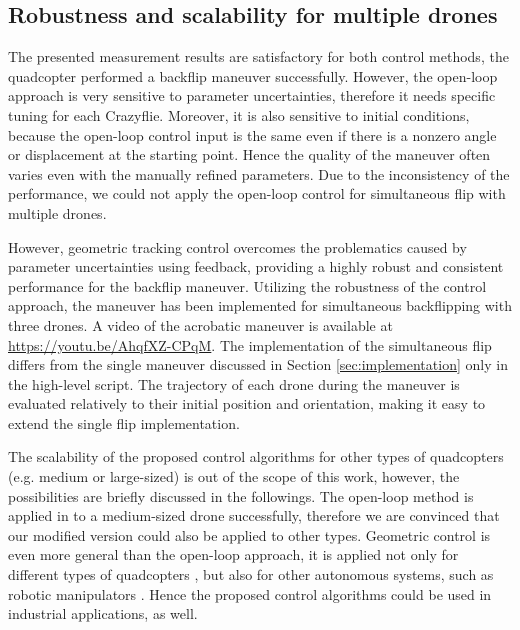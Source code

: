 \subsection{Robustness and scalability for multiple drones}
The presented measurement results are satisfactory for both control methods, the quadcopter performed a backflip maneuver successfully. However, the open-loop approach is very sensitive to parameter uncertainties, therefore it needs specific tuning for each Crazyflie. Moreover, it is also sensitive to initial conditions, because the open-loop control input is the same even if there is a nonzero angle or displacement at the starting point. Hence the quality of the maneuver often varies even with the manually refined parameters. Due to the inconsistency of the performance, we could not apply the open-loop control for simultaneous flip with multiple drones.

However, geometric tracking control overcomes the problematics caused by parameter uncertainties using feedback, providing a highly robust and consistent performance for the backflip maneuver. Utilizing the robustness of the control approach, the maneuver has been implemented for simultaneous backflipping with three drones. A video of the acrobatic maneuver is available at \url{https://youtu.be/AhqfXZ-CPqM}. The implementation of the simultaneous flip differs from the single maneuver discussed in Section \ref{sec:implementation} only in the high-level script. The trajectory of each drone during the maneuver is evaluated relatively to their initial position and orientation, making it easy to extend the single flip implementation. %

The scalability of the proposed control algorithms for other types of quadcopters (e.g. medium or large-sized) is out of the scope of this work, however, the possibilities are briefly discussed in the followings. The open-loop method is applied in \cite{LSICRA2010} to a medium-sized drone successfully, therefore we are convinced that our modified version could also be applied to other types. Geometric control is even more general than the open-loop approach, it is applied not only for different types of quadcopters \cite{turpinkumar2011}, but also for other autonomous systems, such as robotic manipulators \cite{bullo2004}. Hence the proposed control algorithms could be used in industrial applications, as well.